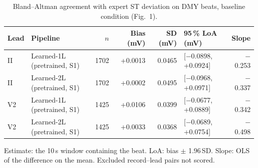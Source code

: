 \begin{table}[htbp]
\centering
\small
\caption{Bland--Altman agreement with expert ST deviation on DMY beats, baseline condition (Fig.~1).}
\label{tab:fig1_ba}
\begin{tabular}{llrrrlr}
\toprule
Lead & Pipeline & $n$ & Bias (mV) & SD (mV) & 95\,\% LoA (mV) & Slope \\
\midrule
II & Learned-1L (pretrained, S1) & 1702 & +0.0013 & 0.0465 & [$-$0.0898, +0.0924] & $-$0.253 \\
II & Learned-2L (pretrained, S1) & 1702 & +0.0002 & 0.0495 & [$-$0.0968, +0.0971] & $-$0.337 \\
\midrule
V2 & Learned-1L (pretrained, S1) & 1425 & +0.0106 & 0.0399 & [$-$0.0677, +0.0889] & $-$0.342 \\
V2 & Learned-2L (pretrained, S1) & 1425 & +0.0033 & 0.0368 & [$-$0.0689, +0.0754] & $-$0.498 \\
\bottomrule
\end{tabular}

\par\smallskip\footnotesize Estimate: the 10\,s window containing the beat. LoA: bias $\pm$ 1.96\,SD. Slope: OLS of the difference on the mean. Excluded record--lead pairs not scored.
\end{table}
